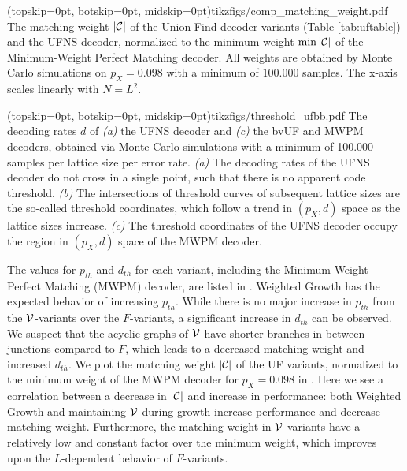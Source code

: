\Figure[b!](topskip=0pt, botskip=0pt, midskip=0pt){tikzfigs/comp_matching_weight.pdf}{
  The matching weight $\lvert\mathcal{C}\rvert$ of the Union-Find decoder variants (Table \ref{tab:uftable}) and the UFNS decoder, normalized to the minimum weight $\min{\lvert\mathcal{C}\rvert}$ of the Minimum-Weight Perfect Matching decoder. All weights are obtained by Monte Carlo simulations on $p_X=0.098$ with a minimum of $100.000$ samples. The x-axis scales linearly with $N = L^2$. \label{comp_weight}}

\Figure[htb](topskip=0pt, botskip=0pt, midskip=0pt){tikzfigs/threshold_ufbb.pdf}{
  The decoding rates $d$ of \emph{(a)} the UFNS decoder and \emph{(c)} the bvUF and MWPM decoders, obtained via Monte Carlo simulations with a minimum of 100.000 samples per lattice size per error rate. \emph{(a)} The decoding rates of the UFNS decoder do not cross in a single point, such that there is no apparent code threshold. \emph{(b)} The intersections of threshold curves of subsequent lattice sizes are the so-called threshold coordinates, which follow a trend in $(p_X, d)$ space as the lattice sizes increase. \emph{(c)} The threshold coordinates of the UFNS decoder occupy the region in $(p_X, d)$ space of the MWPM decoder. \label{threshold_ufbb}}

The values for $p_{th}$ and $d_{th}$ for each variant, including the Minimum-Weight Perfect Matching (MWPM) decoder, are listed in . Weighted Growth has the expected behavior of increasing $p_{th}$. While there is no major increase in $p_{th}$ from the $\mathcal{V}$-variants over the $F$-variants, a significant increase in $d_{th}$ can be observed. We suspect that the acyclic graphs of $\mathcal{V}$ have shorter branches in between junctions compared to $F$, which leads to a decreased matching weight and increased $d_{th}$. We plot the matching weight $\lvert\mathcal{C}\rvert$ of the UF variants, normalized to the minimum weight of the MWPM decoder for $p_X = 0.098$ in . Here we see a correlation between a decrease in $\lvert\mathcal{C}\rvert$ and increase in performance: both Weighted Growth and maintaining $\mathcal{V}$ during growth increase performance and decrease matching weight. Furthermore, the matching weight in $\mathcal{V}$-variants have a relatively low and constant factor over the minimum weight, which improves upon the $L$-dependent behavior of $F$-variants.

